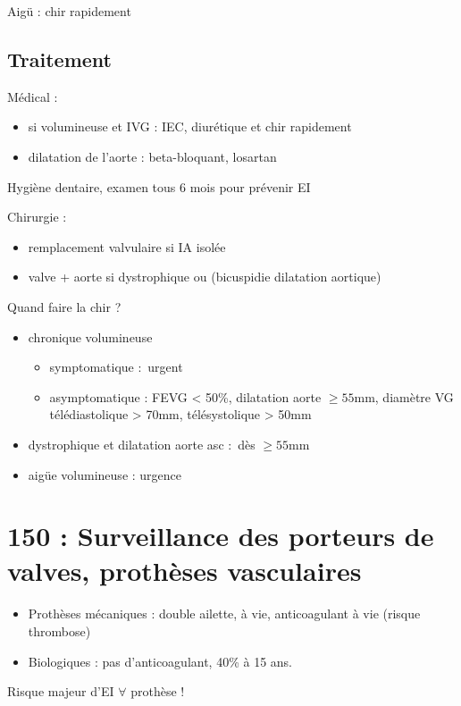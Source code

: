 Aigü : chir rapidement

\subsection{Traitement}
Médical : 
\begin{itemize}
  \item si volumineuse et IVG : IEC, diurétique et chir rapidement
  \item dilatation de l'aorte : beta-bloquant, losartan
\end{itemize}
Hygiène dentaire, examen tous 6 mois pour prévenir EI

Chirurgie : 
\begin{itemize}
  \item remplacement valvulaire si IA isolée
  \item valve + aorte si dystrophique ou (bicuspidie \land{} dilatation aortique)
\end{itemize}

Quand faire la chir ?
\begin{itemize}
  \item chronique volumineuse
    \begin{itemize}
      \item  symptomatique : urgent \danger
      \item asymptomatique : FEVG < 50\%, dilatation aorte $\ge 55$mm, diamètre
        VG télédiastolique > 70mm, télésystolique > 50mm
    \end{itemize}
  \item dystrophique et dilatation aorte asc : dès $\ge 55$mm
  \item aigüe volumineuse : urgence
\end{itemize}

\section{150 : Surveillance des porteurs de valves, prothèses vasculaires}%
\label{sec:150_surveillance_des_porteurs_de_valves_protheses_vasculaires}

\begin{itemize}
  \item Prothèses mécaniques : double ailette, à vie, anticoagulant à vie
    (risque thrombose)
  \item Biologiques : pas d'anticoagulant, 40\% à 15 ans.
\end{itemize}
Risque majeur d'EI $\forall$ prothèse !

